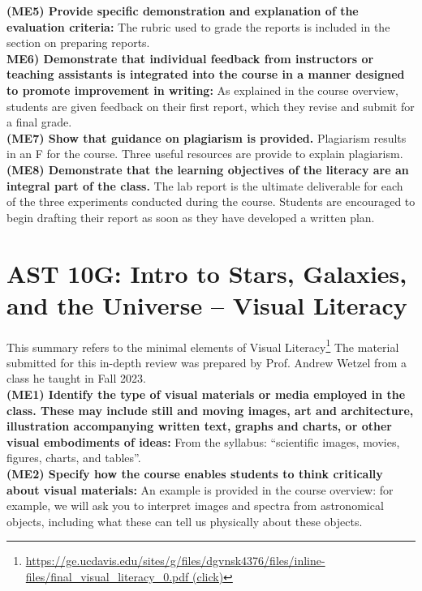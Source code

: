 \documentclass[12pt]{article}
\begin{document}
\noindent
{\bf (ME5) Provide specific demonstration and explanation of the evaluation criteria:}
The rubric used to grade the reports is included in the section on preparing reports.\\[1pt]

\noindent
{\bf ME6) Demonstrate that individual feedback from instructors or teaching assistants is integrated into the course in a manner designed to promote improvement in writing:}
As explained in the course overview, students are given feedback on their first report, which they revise and submit for a final grade.\\[1pt]

\noindent
{\bf (ME7) Show that guidance on plagiarism is provided.}
Plagiarism results in an F for the course.  Three useful resources are provide to explain plagiarism.\\[1pt]

\noindent
{\bf (ME8) Demonstrate that the learning objectives of the literacy are an integral part of the class.}
The lab report is the ultimate deliverable for each of the three experiments conducted during the course.  Students are encouraged to begin drafting their report as soon as they have developed a written plan.\\[1pt]

\section{AST 10G: Intro to  Stars, Galaxies, and the Universe -- Visual Literacy}

This summary refers to the minimal elements of Visual Literacy\footnote{
\href{https://ge.ucdavis.edu/sites/g/files/dgvnsk4376/files/inline-files/final_visual_literacy_0.pdf}{
https://ge.ucdavis.edu/sites/g/files/dgvnsk4376/files/inline-files/final\_visual\_literacy\_0.pdf (click)}}
The material submitted for this in-depth review was prepared by Prof. Andrew
Wetzel from a class he taught in Fall 2023.\\

{\bf (ME1) Identify the type of visual materials or media employed in the class. These
may include still and moving images, art and architecture, illustration
accompanying written text, graphs and charts, or other visual embodiments of
ideas:} From the syllabus:  ``scientific images, movies, figures, charts, and tables''.\\[1pt]

{\bf (ME2) Specify how the course enables students to think critically about visual
  materials:} An example is provided in the course overview:  for example, we will ask you to interpret images and spectra from astronomical objects, including what these can tell us physically about these objects.\\[1pt]
\end{document}
